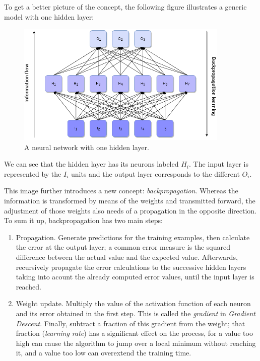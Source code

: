 \newpage

	To get a better picture of the concept, the following figure illustrates a generic model with one hidden layer:

	\vspace{0.2cm}

	\begin{figure}[bth]

        \myfloatalign
        \includegraphics[width=0.9\textwidth]{gfx/NeuralNetwork.png}
        \caption{A neural network with one hidden layer.}

    \end{figure}

    We can see that the hidden layer has its neurons labeled $H_i$. The input layer is represented by the $I_i$ units and the output layer corresponds to the different $O_i$. 

    This image further introduces a new concept: \textit{backpropagation}. Whereas the information is transformed by means of the weights and transmitted forward, the adjustment of those weights also needs of a propagation in the opposite direction. To sum it up, backpropagation has two main steps:

    \begin{enumerate}

    	\item
    	Propagation. Generate predictions for the training examples, then calculate the error at the output layer; a common error measure is the squared difference between the actual value and the expected value. Afterwards, recursively propagate the error calculations to the successive hidden layers taking into acount the already computed error values, until the input layer is reached.

    	\item
    	Weight update. Multiply the value of the activation function of each neuron and its error obtained in the first step. This is called the \textit{gradient} in \textit{Gradient Descent}. Finally, subtract a fraction of this gradient from the weight; that fraction (\textit{learning rate}) has a significant effect on the process, for a value too high can cause the algorithm to jump over a local minimum without reaching it, and a value too low can overextend the training time.

    \end{enumerate}

